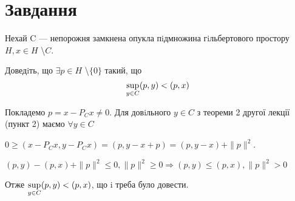 
\chapter{Завдання \theHchapter}


\begin{tcolorbox}[title=Завдання]
    
    Нехай C — непорожня замкнена опукла пiдмножина гiльбертового 
    простору $ H, x \in H $ \textbackslash $C $.
    
    
    Доведiть, що $ \exists p \in H$ \textbackslash $\{0\} $ такий, що
    $$ \displaystyle\sup_{y \in C} (p, y) < (p, x) $$

    
\end{tcolorbox}



Покладемо $p = x - P_C x \neq 0$. Для довiльного $y \in C$ 
з теореми 2 другої лекції (пункт 2) маємо $ \forall y \in C $


$0 \geq (x - P_C x, y - P_C x)=(p, y - x + p)=(p, y - x) + \|p\| ^2$.


$(p, y) - (p, x) + \|p\| ^2 \le 0, \|p\| ^ 2 \geq 0 \Rightarrow 
(p, y) \le (p, x), \|p\| ^ 2 > 0 $ 


Отже $ \displaystyle\sup_{y \in C} (p, y) < (p, x) $,
що i треба було довести.

